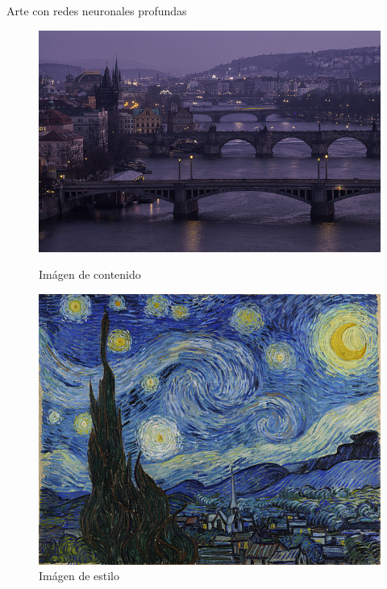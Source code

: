 \documentclass[11pt,usenames, dvipsnames]{beamer}
\begin{document}
\begin{frame}{Arte con redes neuronales profundas}
    \begin{figure}
        \centering
        \begin{minipage}{0.49\textwidth}
            \includegraphics[height=0.45\textheight]{figures/prag}
             \caption{Imágen de contenido}
        \end{minipage}
        \begin{minipage}{0.49\textwidth}
            \includegraphics[height=0.45\textheight]{figures/star}
            \caption{Imágen de estilo}
        \end{minipage}    
    \end{figure}
\end{frame}
\end{document}
